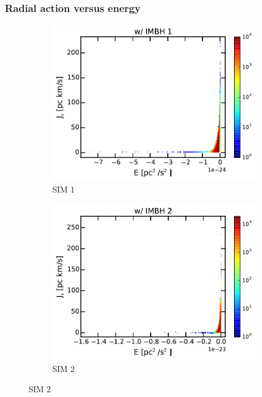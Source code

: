 \subsubsection{Radial action versus energy}
\begin{figure}[htbp]
\centering
	\begin{subfigure}{0.475\textwidth}
		\includegraphics[width=\textwidth]{Plots/E_J_r_hist_IMBH1.pdf}
		\caption{SIM 1}
		\label{fig:E_J_r_hist_IMBH1}
	\end{subfigure}
	\hfill
	\begin{subfigure}{0.475\textwidth}
		\includegraphics[width=\textwidth]{Plots/E_J_r_hist_IMBH2.pdf}
		\caption{SIM 2}
		\label{fig:E_J_r_hist_IMBH2}

\end{subfigure}
\end{figure}
